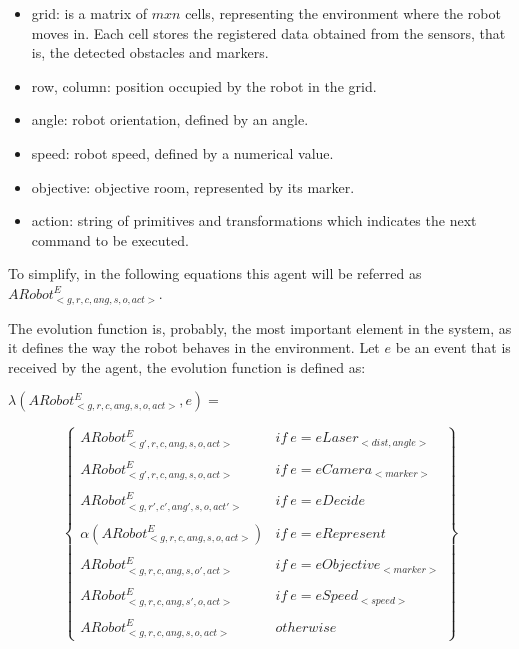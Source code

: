 \documentclass{aamas2012}
\begin{document}
\begin{itemize}
\item grid: is a matrix of $mxn$ cells, representing the environment where the robot moves in. Each cell stores the registered data obtained from the sensors, that is, the detected obstacles and markers.
\item row, column: position occupied by the robot in the grid.
\item angle: robot orientation, defined by an angle.
\item speed: robot speed, defined by a numerical value.
\item objective: objective room, represented by its marker.
\item action: string of primitives and transformations which indicates the next command to be executed.
\end{itemize}

To simplify, in the following equations this agent will be referred as $ARobot^{E}_{<g, r, c, ang, s, o, act>}$.

The evolution function is, probably, the most important element in the system, as it defines the way the robot behaves in the environment. Let $e$ be an event that is received by the agent, the evolution function is defined as:

\begin{small}

$ \lambda (ARobot^{E}_{<g, r, c, ang, s, o, act>}, e)= $

\begin{displaymath}
    \left\{
    \begin{array}{ll}
        ARobot^{E}_{<g', r, c, ang, s, o, act>} & \mathit{if}  \  e = eLaser_{<dist,angle>} \\ \\
      ARobot^{E}_{<g', r, c, ang, s,  o, act>} & \mathit{if}  \  e = eCamera_{<marker>} \\ \\
       ARobot^{E}_{<g, r', c', ang', s, o, act'>} & \mathit{if}  \  e = eDecide \\ \\
         \alpha(ARobot^{E}_{<g, r, c, ang, s, o, act>}) & \mathit{if}  \ e = eRepresent \\ \\
          ARobot^{E}_{<g, r, c, ang, s, o', act>} & \mathit{if}  \ e = eObjective_{<marker>} \\ \\
          ARobot^{E}_{<g, r, c, ang, s', o, act>} & \mathit{if}  \ e = eSpeed_{<speed>} \\ \\
           ARobot^{E}_{<g, r, c, ang, s, o, act>} & otherwise
    \end{array}\right\}
\end{displaymath}
\end{small}
\end{document}
